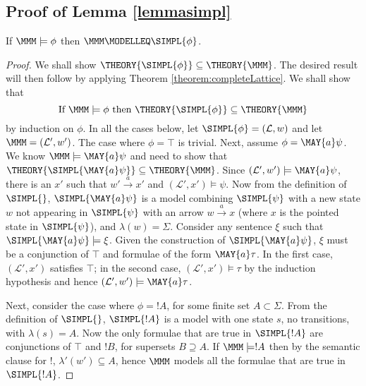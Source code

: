 \subsection{Proof of Lemma \ref{lemmasimpl}}\label{app:decision:proofs}

If $\MMM \models \phi$ then $\MMM \MODELLEQ \SIMPL{\phi}$.

\begin{proof}
We shall show $\THEORY{\SIMPL{\phi}} \subseteq \THEORY{\MMM}$.
The desired result will then follow by applying Theorem \ref{theorem:completeLattice}.
We shall show that
\[
\text{If } \MMM \models \phi \text{ then } \THEORY{\SIMPL{\phi}} \subseteq \THEORY{\MMM}
\]
by induction on $\phi$.
In all the cases below, let $\SIMPL{\phi} = (\mathcal{L}, w)$ and let $\MMM = (\mathcal{L}', w')$.
The case where $\phi = \top$ is trivial.
Next, assume $\phi = \MAY{a} \psi$.
We know $\MMM \models \MAY{a} \psi$ and need to show that $\THEORY{\SIMPL{\MAY{a} \psi}} \subseteq \THEORY{\MMM}$.
Since $(\mathcal{L}', w') \models \MAY{a} \psi$, there is an $x'$ such that $w' \xrightarrow{a} x'$ and $(\mathcal{L}', x') \models \psi$.
Now from the definition of $\SIMPL{}$, $\SIMPL{\MAY{a} \psi}$ is a model combining $\SIMPL{\psi}$ with a new state $w$ not appearing in $\SIMPL{\psi}$ with an arrow $w \xrightarrow{a} x$ (where $x$ is the pointed state in $\SIMPL{\psi}$), and $\lambda(w) = \Sigma$. 
Consider any sentence $\xi$ such that $\SIMPL{\MAY{a} \psi} \models \xi$. Given the construction of $\SIMPL{\MAY{a}\psi}$, $\xi$ must be a conjunction of $\top$ and formulae of the form $\MAY{a} \tau$. In the first case, $(\mathcal{L}', x')$ satisfies $\top$; in the second case, $(\mathcal{L}', x') \models \tau$ by the induction hypothesis and hence $(\mathcal{L}', w') \models \MAY{a} \tau$.

Next, consider the case where $\phi = !A$, for some finite set $A \subset \Sigma$.
From the definition of $\SIMPL{}$, $\SIMPL{!A}$ is a model with one state $s$, no transitions, with $\lambda(s) = A$.
Now the only formulae that are true in $\SIMPL{!A}$ are conjunctions of $\top$ and $!B$, for supersets $B \supseteq A$.
If $\MMM \models !A$ then by the semantic clause for $!$, $\lambda'(w') \subseteq A$, hence $\MMM$ models all the formulae that are true in $\SIMPL{!A}$.


\end{proof}
